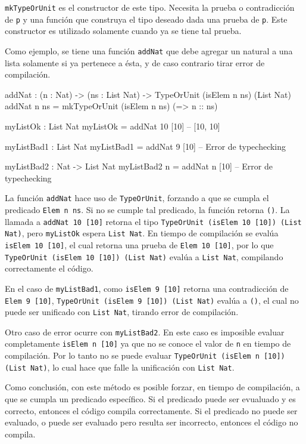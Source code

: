 \texttt{mkTypeOrUnit} es el constructor de este tipo. Necesita la prueba o contradicción de \texttt{p} y una función que construya el tipo deseado dada una prueba de \texttt{p}. Este constructor es utilizado solamente cuando ya se tiene tal prueba.

Como ejemplo, se tiene una función \texttt{addNat} que debe agregar un natural a una lista solamente si ya pertenece a ésta, y de caso contrario tirar error de compilación.

\begin{code}
addNat : (n : Nat) -> (ns : List Nat) ->
  TypeOrUnit (isElem n ns) (List Nat)
addNat n ns = mkTypeOrUnit (isElem n ns)
  (\isElem => n :: ns)

myListOk : List Nat
myListOk = addNat 10 [10] -- [10, 10]

myListBad1 : List Nat
myListBad1 = addNat 9 [10] -- Error de typechecking

myListBad2 : Nat -> List Nat
myListBad2 n = addNat n [10] -- Error de typechecking
\end{code}

La función \texttt{addNat} hace uso de \texttt{TypeOrUnit}, forzando a que se cumpla el predicado \texttt{Elem n ns}. Si no se cumple tal predicado, la función retorna \texttt{()}. La llamada a \texttt{addNat 10 [10]} retorna el tipo \texttt{TypeOrUnit (isElem 10 [10]) (List Nat)}, pero \texttt{myListOk} espera \texttt{List Nat}. En tiempo de compilación se evalúa \texttt{isElem 10 [10]}, el cual retorna una prueba de \texttt{Elem 10 [10]}, por lo que \texttt{TypeOrUnit (isElem 10 [10]) (List Nat)} evalúa a \texttt{List Nat}, compilando correctamente el código.

En el caso de \texttt{myListBad1}, como \texttt{isElem 9 [10]} retorna una contradicción de \texttt{Elem 9 [10]}, \texttt{TypeOrUnit (isElem 9 [10]) (List Nat)} evalúa a \texttt{()}, el cual no puede ser unificado con \texttt{List Nat}, tirando error de compilación.

Otro caso de error ocurre con \texttt{myListBad2}. En este caso es imposible evaluar completamente \texttt{isElem n [10]} ya que no se conoce el valor de \texttt{n} en tiempo de compilación. Por lo tanto no se puede evaluar \texttt{TypeOrUnit (isElem n [10]) (List Nat)}, lo cual hace que falle la unificación con \texttt{List Nat}.

Como conclusión, con este método es posible forzar, en tiempo de compilación, a que se cumpla un predicado específico. Si el predicado puede ser evualuado y es correcto, entonces el código compila correctamente. Si el predicado no puede ser evaluado, o puede ser evaluado pero resulta ser incorrecto, entonces el código no compila.

